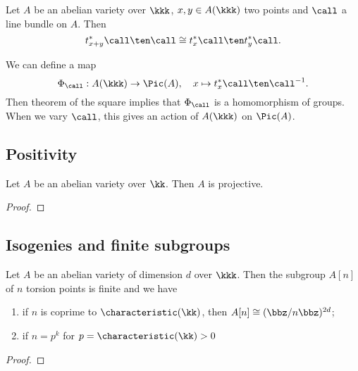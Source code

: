     \begin{theorem}\label{thm: theorem of the square}
        Let \(A\) be an abelian variety over \(\kkk\), \(x,y \in A(\kkk)\) two points and \(\call\) a line bundle on \(A\).
        Then 
        \[ t_{x+y}^*\call \ten \call \cong t_x^*\call \ten t_y^*\call. \]
    \end{theorem}

    \begin{remark}\label{rmk: theorem of the square and homomorphism to Picard group}
        We can define a map
        \[ \Phi_\call: A(\kkk) \to \Pic(A), \quad x \mapsto t_x^*\call \ten \call^{-1}. \]
        Then theorem of the square implies that \(\Phi_\call\) is a homomorphism of groups.
        When we vary \(\call\), this gives an action of \(A(\kkk)\) on \(\Pic(A)\).
    \end{remark}


\subsection{Positivity}

    \begin{theorem}\label{thm: abelian varieties are projective}
        Let $A$ be an abelian variety over $\kk$. 
        Then $A$ is projective.
    \end{theorem}
    \begin{proof}
    \end{proof}


\subsection{Isogenies and finite subgroups}

    \begin{theorem}\label{thm: torsion subgroups of abelian varieties}
        Let \(A\) be an abelian variety of dimension \(d\) over \(\kkk\). 
        Then the subgroup \(A[n]\) of \(n\) torsion points is finite and we have 
        \begin{enumerate}
            \item if \(n\) is coprime to \(\characteristic(\kk)\), then \(A[n] \cong (\bbz/n\bbz)^{2d}\);
            \item if \(n = p^k\) for \(p = \characteristic(\kk) > 0\)
        \end{enumerate}
    \end{theorem}
    \begin{proof}
    \end{proof}



